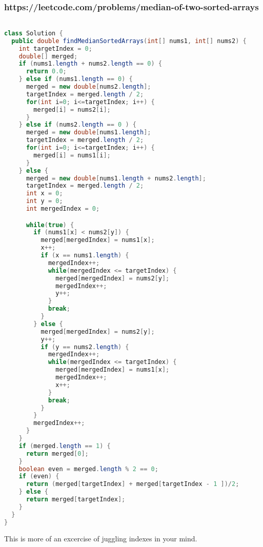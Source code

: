 \documentclass[12pt]{article}
\begin{document}
\subsubsection{https://leetcode.com/problems/median-of-two-sorted-arrays}
\begin{lstlisting}[language=Java]

class Solution {
  public double findMedianSortedArrays(int[] nums1, int[] nums2) {
    int targetIndex = 0;
    double[] merged;
    if (nums1.length + nums2.length == 0) {
      return 0.0;
    } else if (nums1.length == 0) {
      merged = new double[nums2.length];
      targetIndex = merged.length / 2;
      for(int i=0; i<=targetIndex; i++) {
        merged[i] = nums2[i];
      }
    } else if (nums2.length == 0 ) {
      merged = new double[nums1.length];
      targetIndex = merged.length / 2;
      for(int i=0; i<=targetIndex; i++) {
        merged[i] = nums1[i];
      }
    } else {
      merged = new double[nums1.length + nums2.length];
      targetIndex = merged.length / 2;
      int x = 0;
      int y = 0;
      int mergedIndex = 0;

      while(true) {
        if (nums1[x] < nums2[y]) {
          merged[mergedIndex] = nums1[x];
          x++;
          if (x == nums1.length) {
            mergedIndex++;
            while(mergedIndex <= targetIndex) {
              merged[mergedIndex] = nums2[y];
              mergedIndex++;
              y++;
            }
            break;
          }
        } else {
          merged[mergedIndex] = nums2[y];
          y++;
          if (y == nums2.length) {
            mergedIndex++;
            while(mergedIndex <= targetIndex) {
              merged[mergedIndex] = nums1[x];
              mergedIndex++;
              x++;
            }
            break;
          }
        }
        mergedIndex++;
      }
    }
    if (merged.length == 1) {
      return merged[0];
    }
    boolean even = merged.length % 2 == 0;
    if (even) {
      return (merged[targetIndex] + merged[targetIndex - 1 ])/2;
    } else {
      return merged[targetIndex];
    }
  }
}
\end{lstlisting}

This is more of an excercise of juggling indexes in your mind.
\end{document}
